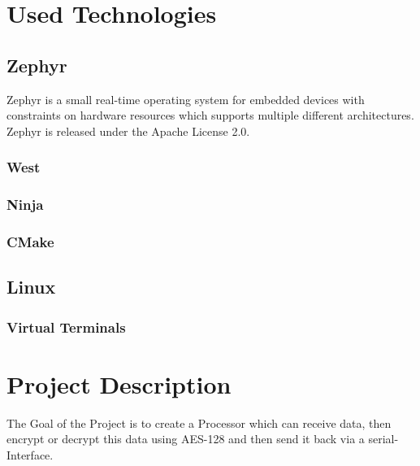 %
%
%
%
%

\section{Used Technologies}

\subsection{Zephyr}

Zephyr is a small real-time operating system for embedded devices with constraints
on hardware resources which supports multiple different architectures.\\
Zephyr is released under the Apache License 2.0.

\subsubsection{West}

\subsubsection{Ninja}

\subsubsection{CMake}


\subsection{Linux}

\subsubsection{Virtual Terminals}

\pagebreak

\section{Project Description}

The Goal of the Project is to create a Processor which can receive data, then
encrypt or decrypt this data using AES-128 and then send it back via a
serial-Interface.
